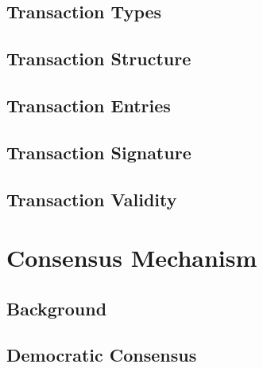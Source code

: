\documentclass[a4paper, 12pt]{book}
\begin{document}
\section{Transaction Types} \label{Sec:Typ}



\section{Transaction Structure} \label{Sec:TStru}




\section{Transaction Entries}\label{Sec:TEnt}



\section{Transaction Signature}\label{Sec:Sig}




\section{Transaction Validity} \label{Sec:Val}





\chapter{Consensus Mechanism} \label{Cha:CM}





\section{Background}\label{Sec:Cbg}



\section{Democratic Consensus}\label{Sec:Dem}
\end{document}
